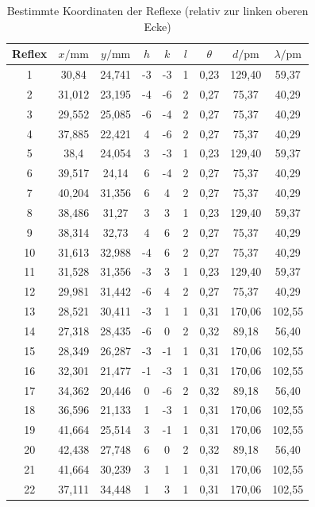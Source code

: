 \begin{table}
\centering
\caption{Bestimmte Koordinaten der Reflexe (relativ zur linken oberen Ecke)}
\label{tab:coords}
\begin{tabular}{ccccccccc}
\toprule
Reflex & $x/\si{\milli\meter}$ & $y/\si{\milli\meter}$ & $h$ & $k$ & $l$ & $\theta$ & $d/\si{\pico\meter}$ & $\lambda/\si{\pico\meter}$\\
\midrule
1 & 30,84 & 24,741 & -3 & -3 & 1 & 0,23 & 129,40 & 59,37\\
2 & 31,012 & 23,195 & -4 & -6 & 2 & 0,27 & 75,37 & 40,29\\
3 & 29,552 & 25,085 & -6 & -4 & 2 & 0,27 & 75,37 & 40,29\\
4 & 37,885 & 22,421 & 4 & -6 & 2 & 0,27 & 75,37 & 40,29\\
5 & 38,4 & 24,054 & 3 & -3 & 1 & 0,23 & 129,40 & 59,37\\
6 & 39,517 & 24,14 & 6 & -4 & 2 & 0,27 & 75,37 & 40,29\\
7 & 40,204 & 31,356 & 6 & 4 & 2 & 0,27 & 75,37 & 40,29\\
8 & 38,486 & 31,27 & 3 & 3 & 1 & 0,23 & 129,40 & 59,37\\
9 & 38,314 & 32,73 & 4 & 6 & 2 & 0,27 & 75,37 & 40,29\\
10 & 31,613 & 32,988 & -4 & 6 & 2 & 0,27 & 75,37 & 40,29\\
11 & 31,528 & 31,356 & -3 & 3 & 1 & 0,23 & 129,40 & 59,37\\
12 & 29,981 & 31,442 & -6 & 4 & 2 & 0,27 & 75,37 & 40,29\\
13 & 28,521 & 30,411 & -3 & 1 & 1 & 0,31 & 170,06 & 102,55\\
14 & 27,318 & 28,435 & -6 & 0 & 2 & 0,32 & 89,18 & 56,40\\
15 & 28,349 & 26,287 & -3 & -1 & 1 & 0,31 & 170,06 & 102,55\\
16 & 32,301 & 21,477 & -1 & -3 & 1 & 0,31 & 170,06 & 102,55\\
17 & 34,362 & 20,446 & 0 & -6 & 2 & 0,32 & 89,18 & 56,40\\
18 & 36,596 & 21,133 & 1 & -3 & 1 & 0,31 & 170,06 & 102,55\\
19 & 41,664 & 25,514 & 3 & -1 & 1 & 0,31 & 170,06 & 102,55\\
20 & 42,438 & 27,748 & 6 & 0 & 2 & 0,32 & 89,18 & 56,40\\
21 & 41,664 & 30,239 & 3 & 1 & 1 & 0,31 & 170,06 & 102,55\\
22 & 37,111 & 34,448 & 1 & 3 & 1 & 0,31 & 170,06 & 102,55\\

\end{tabular}
\end{table}
